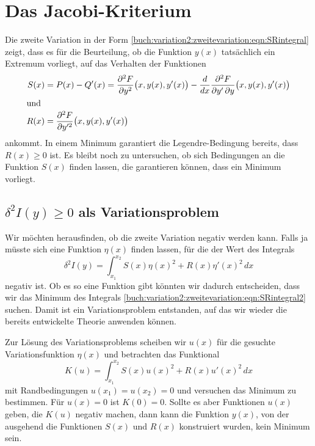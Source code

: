%
%
%
\section{Das Jacobi-Kriterium
\label{buch:variation2:section:jacobi}}
Die zweite Variation in der Form
\eqref{buch:variation2:zweitevariation:eqn:SRintegral}
zeigt, dass es für die Beurteilung, ob die Funktion $y(x)$ tatsächlich
ein Extremum vorliegt, auf das Verhalten der Funktionen
\begin{align*}
S(x)
&=
P(x) - Q'(x)
=
\frac{\partial^2F}{\partial y^2}\bigl(x,y(x),y'(x)\bigr)
-
\frac{d}{dx}\frac{\partial^2 F}{\partial y'\,\partial y}\bigl(x,y(x),y'(x)\bigr)
\\
\intertext{und}
R(x)
&=
\frac{\partial^2F}{\partial y^{\prime2}}\bigl(x,y(x),y'(x)\bigr)
\end{align*}
ankommt.
In einem Minimum garantiert die Legendre-Bedingung bereits,
dass $R(x)\ge 0$ ist.
Es bleibt noch zu untersuchen, ob sich Bedingungen an die Funktion
$S(x)$ finden lassen, die garantieren können, dass ein Minimum
vorliegt.

%
%
\subsection{$\delta^2 I(y)\ge 0$ als Variationsproblem
\label{buch:variation2:jacobi:subsection:delta2I}}
Wir möchten herausfinden, ob die zweite Variation negativ werden kann.
Falls ja müsste sich eine Funktion $\eta(x)$ finden lassen, für die
der Wert des Integrals
\begin{equation}
\delta^2 I(y)
=
\int_{x_1}^{x_2}
S(x)\eta(x)^2 + R(x)\eta'(x)^2
\,dx
\label{buch:variation2:zweitevariation:eqn:SRintegral2}
\end{equation}
negativ ist.
Ob es so eine Funktion gibt könnten wir dadurch entscheiden, dass wir
das Minimum des Integrals
\eqref{buch:variation2:zweitevariation:eqn:SRintegral2}
suchen.
Damit ist ein Variationsproblem entstanden, auf das wir wieder die
bereits entwickelte Theorie anwenden können.

Zur Lösung des Variationsproblems scheiben wir $u(x)$ für die gesuchte
Variationsfunktion $\eta(x)$ und betrachten das Funktional
\begin{equation}
K(u)
=
\int_{x_1}^{x_2}
S(x) u(x)^2 + R(x) u'(x)^2
\,dx
\label{buch:variation2:jacobi:eqn:K}
\end{equation}
mit Randbedingungen $u(x_1)=u(x_2)=0$ und versuchen das Minimum
zu bestimmen.
Für $u(x)=0$ ist $K(0)=0$.
Sollte es aber Funktionen $u(x)$ geben, die $K(u)$ negativ machen,
dann kann die Funktion $y(x)$, von der ausgehend die Funktionen $S(x)$
und $R(x)$ konstruiert wurden, kein Minimum sein.

